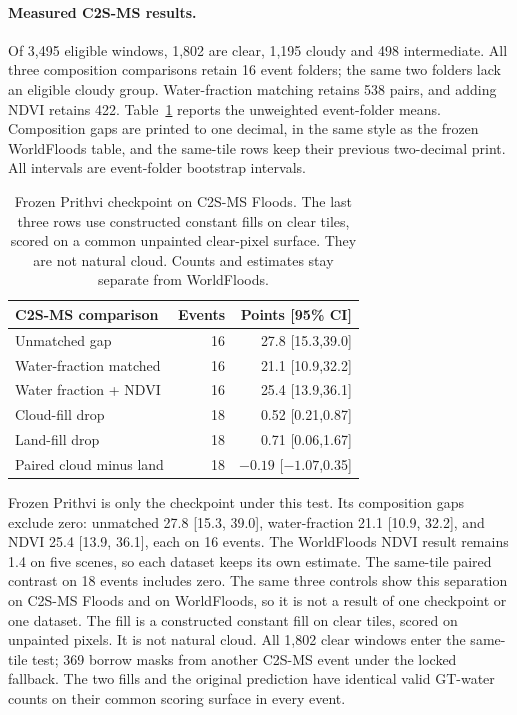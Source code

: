 \paragraph{Measured C2S-MS results.}
Of 3,495 eligible windows, 1,802 are clear, 1,195 cloudy and 498 intermediate.
All three composition comparisons retain 16 event folders; the same two folders lack an eligible cloudy group.
Water-fraction matching retains 538 pairs, and adding NDVI retains 422.
Table~\ref{tab:c2sms} reports the unweighted event-folder means.
Composition gaps are printed to one decimal, in the same style as the frozen WorldFloods table, and the same-tile rows keep their previous two-decimal print.
All intervals are event-folder bootstrap intervals.

\begin{table}[t]
\centering\footnotesize
\setlength{\tabcolsep}{3pt}
\begin{tabular}{lrr}
\toprule
C2S-MS comparison & Events & Points [95\% CI]\\
\midrule
Unmatched gap &16&27.8 [15.3,39.0]\\
Water-fraction matched &16&21.1 [10.9,32.2]\\
Water fraction + NDVI &16&25.4 [13.9,36.1]\\
\midrule
Cloud-fill drop &18&0.52 [0.21,0.87]\\
Land-fill drop &18&0.71 [0.06,1.67]\\
Paired cloud minus land &18&$-0.19$ [$-1.07$,0.35]\\
\bottomrule
\end{tabular}
\caption{Frozen Prithvi checkpoint on C2S-MS Floods. The last three rows use constructed constant fills on clear tiles, scored on a common unpainted clear-pixel surface. They are not natural cloud. Counts and estimates stay separate from WorldFloods.}
\label{tab:c2sms}
\end{table}

Frozen Prithvi is only the checkpoint under this test.
Its composition gaps exclude zero: unmatched 27.8 [15.3, 39.0], water-fraction 21.1 [10.9, 32.2], and NDVI 25.4 [13.9, 36.1], each on 16 events.
The WorldFloods NDVI result remains 1.4 on five scenes, so each dataset keeps its own estimate.
The same-tile paired contrast on 18 events includes zero.
The same three controls show this separation on C2S-MS Floods and on WorldFloods, so it is not a result of one checkpoint or one dataset.
The fill is a constructed constant fill on clear tiles, scored on unpainted pixels.
It is not natural cloud.
All 1,802 clear windows enter the same-tile test; 369 borrow masks from another C2S-MS event under the locked fallback.
The two fills and the original prediction have identical valid GT-water counts on their common scoring surface in every event.

